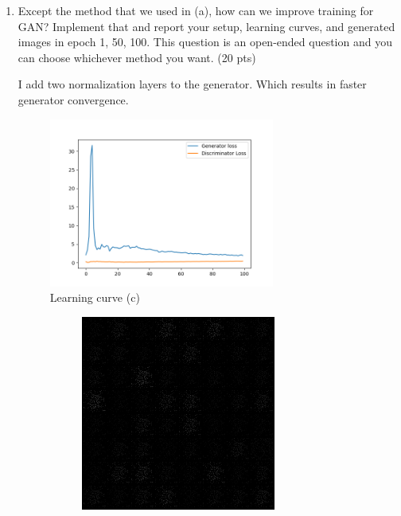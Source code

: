 \documentclass[a4paper]{article}
\theoremstyle{definition}
\newenvironment{soln}{
	\leavevmode\color{blue}\ignorespaces
}{}
\begin{document}
\begin{enumerate} [label=(\alph*)]
	      \pagebreak
	\item Except the method that we used in (a), how can we improve training for GAN? Implement that and report your setup, learning curves, and generated images in epoch 1, 50, 100.
	      This question is an open-ended question and you can choose whichever method you want.
	      \hfill (20 pts)

	      \begin{soln}
		      I add two normalization layers to the generator. Which results in faster generator convergence.

		      \begin{figure}[H]
			      \centering
			      \includegraphics[width=0.7\textwidth]{img/q1_3/loss.png}
			      \caption*{Learning curve (c)}
		      \end{figure}
		      \begin{figure}[H]
			      \centering
			      \begin{subfigure}[b]{0.3\textwidth}
				      \centering
				      \includegraphics[width=\textwidth]{img/q1_3/gen_img1.png}

\end{subfigure}
\end{figure}
\end{soln}
\end{enumerate}
\end{document}
